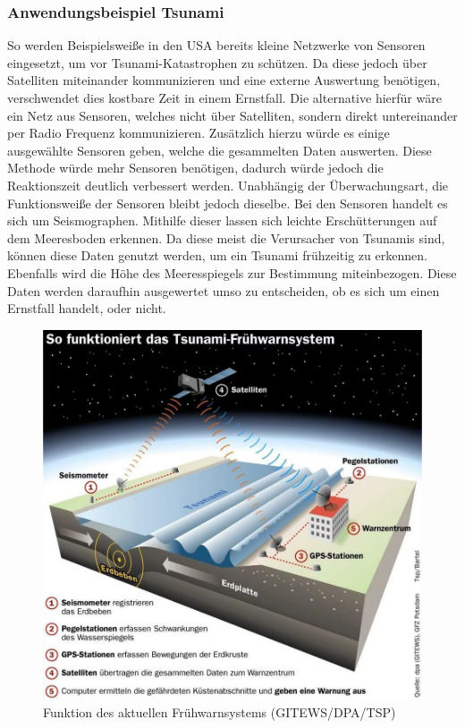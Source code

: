 \documentclass[a4paper,12pt]{scrartcl}
\begin{document}
\subsubsection{Anwendungsbeispiel Tsunami}
So werden Beispielsweiße in den USA bereits kleine Netzwerke von Sensoren eingesetzt, um vor Tsunami-Katastrophen zu schützen. Da diese jedoch über Satelliten miteinander kommunizieren und eine externe Auswertung benötigen, verschwendet dies kostbare Zeit in einem Ernstfall. Die alternative hierfür wäre ein Netz aus Sensoren, welches nicht über Satelliten, sondern direkt untereinander per Radio Frequenz kommunizieren. Zusätzlich hierzu würde es einige ausgewählte Sensoren geben, welche die gesammelten Daten auswerten. Diese Methode würde mehr Sensoren benötigen, dadurch würde jedoch die Reaktionszeit deutlich verbessert werden.
Unabhängig der Überwachungsart, die Funktionsweiße der Sensoren bleibt jedoch dieselbe. Bei den Sensoren handelt es sich um Seismographen. Mithilfe dieser lassen sich leichte Erschütterungen auf dem Meeresboden erkennen. Da diese meist die Verursacher von Tsunamis sind, können diese Daten genutzt werden, um ein Tsunami frühzeitig zu erkennen. Ebenfalls wird die Höhe des Meeresspiegels zur Bestimmung miteinbezogen. Diese Daten werden daraufhin ausgewertet umso zu entscheiden, ob es sich um einen Ernstfall handelt, oder nicht. 
\cite[Seite 3 ff.]{Casey.2008}

\begin{figure}[H]
\centering
\includegraphics[scale=0.6]{picture/tsunami}
\caption{Funktion des aktuellen Frühwarnsystems (GITEWS/DPA/TSP)}
\label{fig:Funktion des aktuellen Fruehwarnsystems}
\end{figure}
\end{document}
